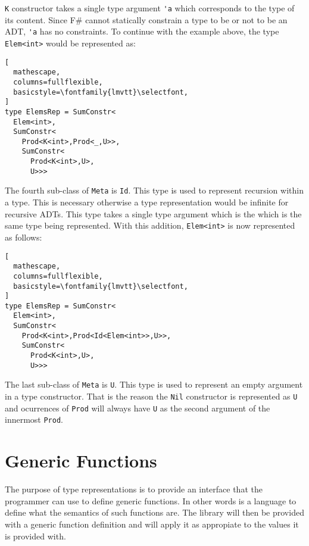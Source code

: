\documentclass{sigplanconf}
\begin{document}
\verb+K+ constructor takes a single type argument \verb+'a+ which
corresponds to the type of its content. Since F\# cannot statically
constrain a type to be or not to be an ADT, \verb+'a+ has no
constraints. To continue with the example above, the type
\verb+Elem<int>+ would be represented as:
\begin{lstlisting}[
  mathescape,
  columns=fullflexible,
  basicstyle=\fontfamily{lmvtt}\selectfont,
]
type ElemsRep = SumConstr<
  Elem<int>,
  SumConstr<
    Prod<K<int>,Prod<_,U>>,
    SumConstr<
      Prod<K<int>,U>,
      U>>>
\end{lstlisting}
The fourth sub-class of \verb+Meta+ is \verb+Id+. This type is used to
represent recursion within a type. This is necessary otherwise a type
representation would be infinite for recursive ADTs. This type takes a
single type argument which is the which is the same type being
represented. With this addition, \verb+Elem<int>+ is now represented
as follows:
\begin{lstlisting}[
  mathescape,
  columns=fullflexible,
  basicstyle=\fontfamily{lmvtt}\selectfont,
]
type ElemsRep = SumConstr<
  Elem<int>,
  SumConstr<
    Prod<K<int>,Prod<Id<Elem<int>>,U>>,
    SumConstr<
      Prod<K<int>,U>,
      U>>>
\end{lstlisting}
The last sub-class of \verb+Meta+ is \verb+U+. This type is used to
represent an empty argument in a type constructor. That is the reason
the \verb+Nil+ constructor is represented as \verb+U+ and ocurrences
of \verb+Prod+ will always have \verb+U+ as the second argument of the
innermost \verb+Prod+.
\section{Generic Functions}
The purpose of type representations is to provide an interface that
the programmer can use to define generic functions. In other words is
a language to define what the semantics of such functions are. The
library will then be provided with a generic function definition and
will apply it as appropiate to the values it is provided with.
\end{document}
